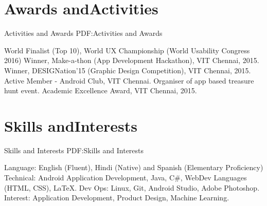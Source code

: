 \documentclass[letterpaper,10pt,oneside]{article}
\newcommand{\CVNote}{CV compiled on {\today} for MITACS}
\begin{document}
\begin{body}

\section
{Awards and\hfill \break Activities}
{Activities and Awards}
{PDF:Activities and Awards}

\BulletItem
World Finalist (Top 10), World UX Championship (World Usability Congress 2016) 
\BulletItem
Winner, Make-a-thon (App Development Hackathon), VIT Chennai, 2015.
\BulletItem
Winner, DESIGNation'15 (Graphic Design Competition), VIT Chennai, 2015.
\BulletItem
Active Member - Android Club, VIT Chennai. Organiser of app based treasure hunt event.
\BulletItem
Academic Excellence Award, VIT Chennai, 2015.


\section
{Skills and\hfill \break Interests}
{Skills and Interests}
{PDF:Skills and Interests}

\BulletItem
Language: English (Fluent), Hindi (Native) and Spanish (Elementary Proficiency) 
\BulletItem
Technical: Android Application Development, Java, C\#, WebDev Languages (HTML, CSS), {\LaTeX}.
\BulletItem
Dev Ops: Linux, Git, Android Studio, Adobe Photoshop.   
\BulletItem
Interest: Application Development, Product Design, Machine Learning.

\end{body}


\begin{flushright}
\UseNoteFont%
\end{flushright}

\label{LastPage}~
\end{document}
